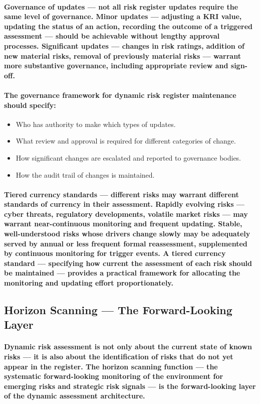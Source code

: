 \paragraph{\textbf{Governance of updates} — not all risk register updates require the same level of governance. Minor updates — adjusting a KRI value, updating the status of an action, recording the outcome of a triggered assessment — should be achievable without lengthy approval processes. Significant updates — changes in risk ratings, addition of new material risks, removal of previously material risks — warrant more substantive governance, including appropriate review and sign-off.}
\paragraph{The governance framework for dynamic risk register maintenance should specify:}
\begin{itemize}
  \item{Who has authority to make which types of updates.}
  \item{What review and approval is required for different categories of change.}
  \item{How significant changes are escalated and reported to governance bodies.}
  \item{How the audit trail of changes is maintained.}
\end{itemize}

\paragraph{\textbf{Tiered currency standards} — different risks may warrant different standards of currency in their assessment. Rapidly evolving risks — cyber threats, regulatory developments, volatile market risks — may warrant near-continuous monitoring and frequent updating. Stable, well-understood risks whose drivers change slowly may be adequately served by annual or less frequent formal reassessment, supplemented by continuous monitoring for trigger events. A tiered currency standard — specifying how current the assessment of each risk should be maintained — provides a practical framework for allocating the monitoring and updating effort proportionately.}

\subsection{Horizon Scanning — The Forward-Looking Layer}
\paragraph{Dynamic risk assessment is not only about the current state of known risks — it is also about the identification of risks that do not yet appear in the register. The horizon scanning function — the systematic forward-looking monitoring of the environment for emerging risks and strategic risk signals — is the forward-looking layer of the dynamic assessment architecture.}
